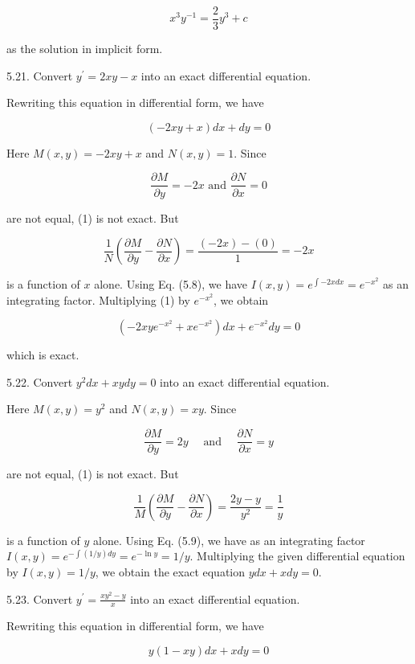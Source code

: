\documentclass[10pt]{article}
\begin{document}
$$
x^{3} y^{-1}=\frac{2}{3} y^{3}+c
$$

as the solution in implicit form.

5.21. Convert $y^{\prime}=2 x y-x$ into an exact differential equation.

Rewriting this equation in differential form, we have


\begin{equation*}
(-2 x y+x) d x+d y=0 \tag{1}
\end{equation*}


Here $M(x, y)=-2 x y+x$ and $N(x, y)=1$. Since

$$
\frac{\partial M}{\partial y}=-2 x \text { and } \frac{\partial N}{\partial x}=0
$$

are not equal, (1) is not exact. But

$$
\frac{1}{N}\left(\frac{\partial M}{\partial y}-\frac{\partial N}{\partial x}\right)=\frac{(-2 x)-(0)}{1}=-2 x
$$

is a function of $x$ alone. Using Eq. (5.8), we have $I(x, y)=e^{\int-2 x d x}=e^{-x^{2}}$ as an integrating factor. Multiplying (1) by $e^{-x^{2}}$, we obtain


\begin{equation*}
\left(-2 x y e^{-x^{2}}+x e^{-x^{2}}\right) d x+e^{-x^{2}} d y=0 \tag{2}
\end{equation*}


which is exact.

5.22. Convert $y^{2} d x+x y d y=0$ into an exact differential equation.

Here $M(x, y)=y^{2}$ and $N(x, y)=x y$. Since

$$
\frac{\partial M}{\partial y}=2 y \quad \text { and } \quad \frac{\partial N}{\partial x}=y
$$

are not equal, (1) is not exact. But

$$
\frac{1}{M}\left(\frac{\partial M}{\partial y}-\frac{\partial N}{\partial x}\right)=\frac{2 y-y}{y^{2}}=\frac{1}{y}
$$

is a function of $y$ alone. Using Eq. (5.9), we have as an integrating factor $I(x, y)=e^{-\int(1 / y) d y}=e^{-\ln y}=1 / y$. Multiplying the given differential equation by $I(x, y)=1 / y$, we obtain the exact equation $y d x+x d y=0$.

5.23. Convert $y^{\prime}=\frac{x y^{2}-y}{x}$ into an exact differential equation.

Rewriting this equation in differential form, we have


\begin{equation*}
y(1-x y) d x+x d y=0 \tag{1}
\end{equation*}
\end{document}

